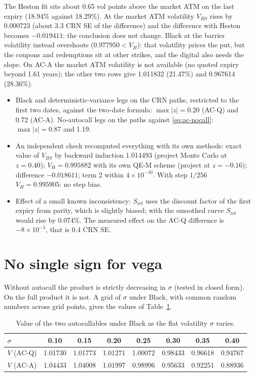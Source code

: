 The Heston fit sits about 0.65 vol points above the market ATM on the last expiry (18.94\% against 18.29\%). At the
market ATM volatility $V_{BS}$ rises by 0.000723 (about 3.3 CRN SE of the difference) and the difference with Heston
becomes $-0.019411$: the conclusion does not change. Black at the barrier volatility instead overshoots
($0.977950<V_H$): that volatility prices the put, but the coupons and redemptions sit at other strikes, and the digital
also needs the slope. On \mbox{AC-A} the market ATM volatility is not available (no quoted expiry beyond 1.61 years);
the other two rows give 1.011832 (21.47\%) and 0.967614 (28.36\%).

\begin{progetto}[title={In the qpricer project: checks on the calibrated comparison}]
\begin{itemize}
\item Black and deterministic-variance legs on the CRN paths, restricted to the first two dates, against the two-date
formula: $\max|z|=0.20$ (\mbox{AC-Q}) and 0.72 (\mbox{AC-A}). No-autocall legs on the paths against
\eqref{eq:ac-nocall}: $\max|z|=0.87$ and 1.19.
\item An independent check recomputed everything with its own methods: exact value of $V_{BS}$ by backward induction
1.014493 (project Monte Carlo at $z=0.40$); $V_H=0.995882$ with its own QE-M scheme (project at $z=-0.16$); difference
$-0.018611$; term 2 within $4\times10^{-10}$. With step $1/256$ $V_H=0.995905$: no step bias.
\item Effect of a small known inconsistency: $S_{\text{ref}}$ uses the discount factor of the first expiry from
parity, which is slightly biased; with the smoothed curve $S_{\text{ref}}$ would rise by 0.074\%. The measured effect
on the \mbox{AC-Q} difference is $-8\times10^{-5}$, that is 0.4 CRN SE.
\end{itemize}
\end{progetto}

\section{No single sign for vega}
\label{sec:ac-vega}
Without autocall the product is strictly decreasing in $\sigma$ (tested in closed form). On the full product it is not.
A grid of $\sigma$ under Black, with common random numbers across grid points, gives the values of Table~\ref{tab:ac-vega}.
\begin{table}[htbp]
\centering
\small
\caption{Value of the two autocallables under Black as the flat volatility $\sigma$ varies.}
\label{tab:ac-vega}
\begin{tabular*}{\textwidth}{@{\extracolsep{\fill}}lccccccc@{}}
\toprule
$\sigma$ & 0.10 & 0.15 & 0.20 & 0.25 & 0.30 & 0.35 & 0.40\\
\midrule
$V$ (\mbox{AC-Q}) & 1.01730 & 1.01773 & 1.01271 & 1.00072 & 0.98433 & 0.96618 & 0.94767\\
$V$ (\mbox{AC-A}) & 1.04433 & 1.04008 & 1.01997 & 0.98996 & 0.95633 & 0.92251 & 0.88936\\
\bottomrule
\end{tabular*}
\end{table}

